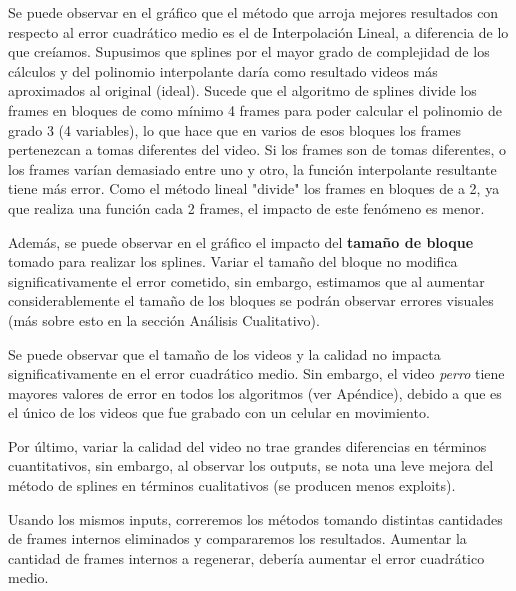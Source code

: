 \par Se puede observar en el gráfico que el método que arroja mejores resultados con respecto al error cuadrático medio es el de Interpolación Lineal, a diferencia de lo que creíamos. Supusimos que splines por el mayor grado de complejidad de los cálculos y del polinomio interpolante daría como resultado videos más aproximados al original (ideal). Sucede que el algoritmo de splines divide los frames en bloques de como mínimo 4 frames para poder calcular el polinomio de grado 3 (4 variables), lo que hace que en varios de esos bloques los frames pertenezcan a tomas diferentes del video. Si los frames son de tomas diferentes, o los frames varían demasiado entre uno y otro, la función interpolante resultante tiene más error. Como el método lineal "divide" los frames en bloques de a 2, ya que realiza una función cada 2 frames, el impacto de este fenómeno es menor.
\par Además, se puede observar en el gráfico el impacto del \textbf{tamaño de bloque }tomado para realizar los splines. Variar el tamaño del bloque no modifica significativamente el error cometido, sin embargo, estimamos que al aumentar considerablemente el tamaño de los bloques se podrán observar errores visuales (más sobre esto en la sección Análisis Cualitativo).
\par Se puede observar que el tamaño de los videos y la calidad no impacta significativamente en el error cuadrático medio. Sin embargo, el video \textit{perro}  tiene mayores valores de error en todos los algoritmos (ver Apéndice), debido a que es el único de los videos que fue grabado con un celular en movimiento.
\par Por último, variar la calidad del video no trae grandes diferencias en términos cuantitativos, sin embargo, al observar los outputs, se nota una leve mejora del método de splines en términos cualitativos (se producen menos exploits). 


\par Usando los mismos inputs, correremos los métodos tomando distintas cantidades de frames internos eliminados y compararemos los resultados. Aumentar la cantidad de frames internos a regenerar, debería aumentar el error cuadrático medio.

